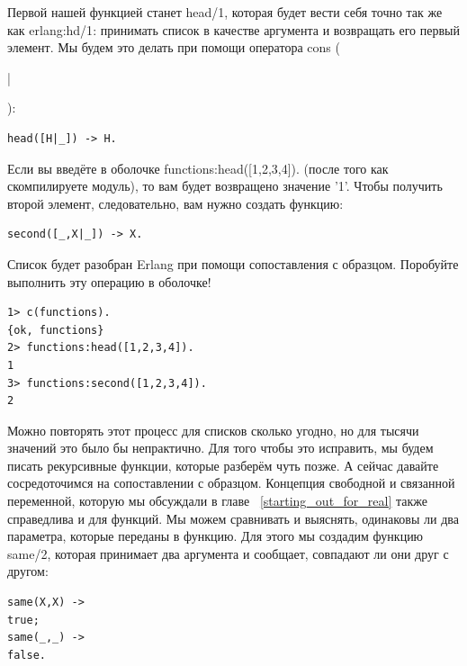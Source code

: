 \documentclass[a4paper,12pt]{report}
\newcommand{\ops}{\colorbox{lgreen}}
\begin{document}
Первой нашей функцией станет \ops{head/1}, которая будет вести себя точно так же как \ops{erlang:hd/1}: принимать список в качестве аргумента и возвращать его первый элемент. Мы будем это делать при помощи оператора cons (\ops{\strut|}):
\begin{lstlisting}[style=erlang]
head([H|_]) -> H.
\end{lstlisting}

Если вы введёте в оболочке \ops{functions:head([1,2,3,4]).} (после того как скомпилируете модуль), то вам будет возвращено значение '1'. Чтобы получить второй элемент, следовательно, вам нужно создать функцию: 
\begin{lstlisting}[style=erlang]
second([_,X|_]) -> X.
\end{lstlisting}

Список будет разобран Erlang при помощи сопоставления с образцом. Поробуйте выполнить эту операцию в оболочке!
\begin{lstlisting}[style=erlang]
1> c(functions).
{ok, functions}
2> functions:head([1,2,3,4]).
1
3> functions:second([1,2,3,4]).
2
\end{lstlisting}

Можно повторять этот процесс для списков сколько угодно, но для тысячи значений это было бы непрактично. Для того чтобы это исправить, мы будем писать рекурсивные функции, которые разберём чуть позже. А сейчас давайте сосредоточимся на сопоставлении с образцом. Концепция свободной и связанной переменной, которую мы обсуждали в главе ~\ref{starting_out_for_real} также справедлива и для функций. Мы можем сравнивать и выяснять, одинаковы ли два параметра, которые переданы в функцию. Для этого мы создадим функцию \ops{same/2}, которая принимает два аргумента и сообщает, совпадают ли они друг с другом:
\begin{lstlisting}[style=erlang]
same(X,X) ->
true;
same(_,_) ->
false.
\end{lstlisting}
\end{document}
